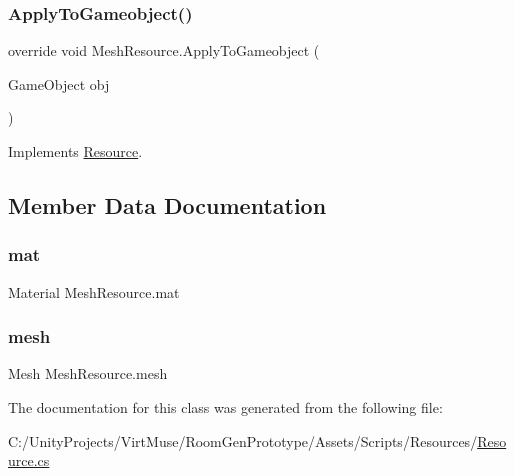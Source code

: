 \subsubsection{\texorpdfstring{Apply\+To\+Gameobject()}{ApplyToGameobject()}}
{\footnotesize\ttfamily override void Mesh\+Resource.\+Apply\+To\+Gameobject (\begin{DoxyParamCaption}\item[{Game\+Object}]{obj }\end{DoxyParamCaption})\hspace{0.3cm}{\ttfamily [virtual]}}



Implements \mbox{\hyperlink{class_resource_a2461ea96169926a858f02ebaf94157fb}{Resource}}.



\subsection{Member Data Documentation}
\mbox{\label{class_mesh_resource_adfdc1e465f534b5e74a33d6880460e35}} 
\subsubsection{\texorpdfstring{mat}{mat}}
{\footnotesize\ttfamily Material Mesh\+Resource.\+mat\hspace{0.3cm}{\ttfamily [private]}}

\mbox{\label{class_mesh_resource_a4c0c407759bcc6540dc77547ad805108}} 
\subsubsection{\texorpdfstring{mesh}{mesh}}
{\footnotesize\ttfamily Mesh Mesh\+Resource.\+mesh\hspace{0.3cm}{\ttfamily [private]}}



The documentation for this class was generated from the following file\+:\begin{DoxyCompactItemize}
\item 
C\+:/\+Unity\+Projects/\+Virt\+Muse/\+Room\+Gen\+Prototype/\+Assets/\+Scripts/\+Resources/\mbox{\hyperlink{_resource_8cs}{Resource.\+cs}}\end{DoxyCompactItemize}
